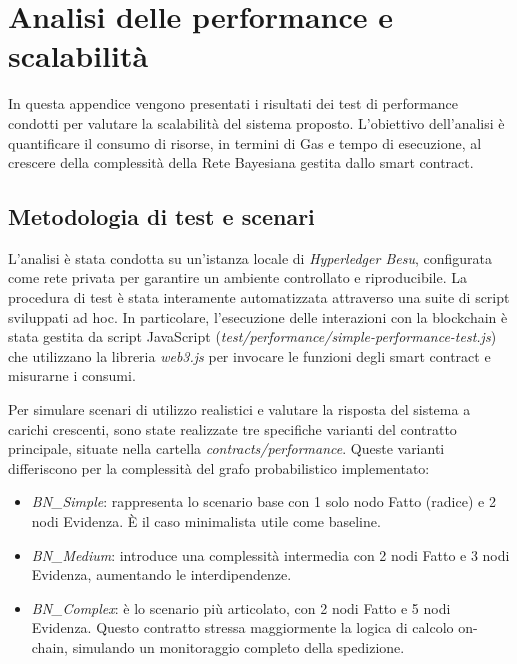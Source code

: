 \chapter{Analisi delle performance e scalabilità}
\label{app:performance}

In questa appendice vengono presentati i risultati dei test di performance condotti per valutare la scalabilità del sistema proposto. L'obiettivo dell'analisi è quantificare il consumo di risorse, in termini di Gas e tempo di esecuzione, al crescere della complessità della Rete Bayesiana gestita dallo smart contract.
    
    \section{Metodologia di test e scenari}
    
    L'analisi è stata condotta su un'istanza locale di \textit{Hyperledger Besu}, configurata come rete privata per garantire un ambiente controllato e riproducibile. La procedura di test è stata interamente automatizzata attraverso una suite di script sviluppati ad hoc. In particolare, l'esecuzione delle interazioni con la blockchain è stata gestita da script JavaScript (\textit{test/performance/simple-performance-test.js}) che utilizzano la libreria \textit{web3.js} per invocare le funzioni degli smart contract e misurarne i consumi.
    
    Per simulare scenari di utilizzo realistici e valutare la risposta del sistema a carichi crescenti, sono state realizzate tre specifiche varianti del contratto principale, situate nella cartella \textit{contracts/performance}. Queste varianti differiscono per la complessità del grafo probabilistico implementato:
    
    \begin{itemize}
        \item \textit{BN\_Simple}: rappresenta lo scenario base con 1 solo nodo Fatto (radice) e 2 nodi Evidenza. È il caso minimalista utile come baseline.
        \item \textit{BN\_Medium}: introduce una complessità intermedia con 2 nodi Fatto e 3 nodi Evidenza, aumentando le interdipendenze.
        \item \textit{BN\_Complex}: è lo scenario più articolato, con 2 nodi Fatto e 5 nodi Evidenza. Questo contratto stressa maggiormente la logica di calcolo on-chain, simulando un monitoraggio completo della spedizione.
    \end{itemize}
    
